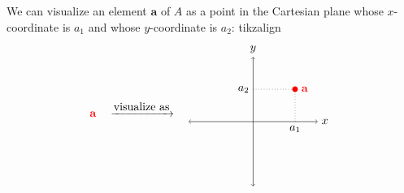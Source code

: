 \documentclass[a4paper,11pt]{book}
\theoremstyle{definition}
\newcommand{\ve}[1]{\mathbf{#1}}
\begin{document}
We can visualize an element $\ve{a}$ of $A$ as a point in the Cartesian plane whose $x$-coordinate is $a_1$ and whose $y$-coordinate is $a_2$:
tikzalign
\begin{align*}
{\color{red} \ve{a}} \quad \xrightarrow{\mbox{visualize as}} \quad
\begin{tikzpicture}[baseline={([yshift=-.5ex]current bounding box.center)},vertex/.style={anchor=base,
	circle,fill=black!25,minimum size=18pt,inner sep=2pt}]
\draw[<->] (-2, 0) -- (2,0) node[right] {$x$};
\draw[<->] (0, -2) -- (0, 2) node[above] {$y$};
\node [circle, fill=black, inner sep=0pt, minimum size=5pt, color=red] (P) at (1.3, 1) {};
\draw[dotted] (1.3, 0) node[below] {$a_1$} -- (1.3, 1);
\draw[dotted] (0, 1) node[left] {$a_2$} -- (1.3, 1);
\node[color=red] at (1.6,1) {$\ve{a}$};
\end{tikzpicture}
\end{align*}
\end{document}

